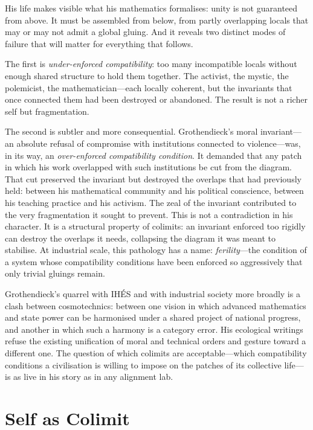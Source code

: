 His life makes visible what his mathematics formalises: unity is not guaranteed from above. It must be assembled from below, from partly overlapping locals that may or may not admit a global gluing. And it reveals two distinct modes of failure that will matter for everything that follows.

The first is \emph{under-enforced compatibility}: too many incompatible locals without enough shared structure to hold them together. The activist, the mystic, the polemicist, the mathematician---each locally coherent, but the invariants that once connected them had been destroyed or abandoned. The result is not a richer self but fragmentation.

The second is subtler and more consequential. Grothendieck's moral invariant---an absolute refusal of compromise with institutions connected to violence---was, in its way, an \emph{over-enforced compatibility condition}. It demanded that any patch in which his work overlapped with such institutions be cut from the diagram. That cut preserved the invariant but destroyed the overlaps that had previously held: between his mathematical community and his political conscience, between his teaching practice and his activism. The zeal of the invariant contributed to the very fragmentation it sought to prevent. This is not a contradiction in his character. It is a structural property of colimits: an invariant enforced too rigidly can destroy the overlaps it needs, collapsing the diagram it was meant to stabilise. At industrial scale, this pathology has a name: \emph{ferility}---the condition of a system whose compatibility conditions have been enforced so aggressively that only trivial gluings remain.

Grothendieck's quarrel with IH\'{E}S and with industrial society more broadly is a clash between cosmotechnics: between one vision in which advanced mathematics and state power can be harmonised under a shared project of national progress, and another in which such a harmony is a category error. His ecological writings refuse the existing unification of moral and technical orders and gesture toward a different one. The question of which colimits are acceptable---which compatibility conditions a civilisation is willing to impose on the patches of its collective life---is as live in his story as in any alignment lab.


\section{Self as Colimit}

